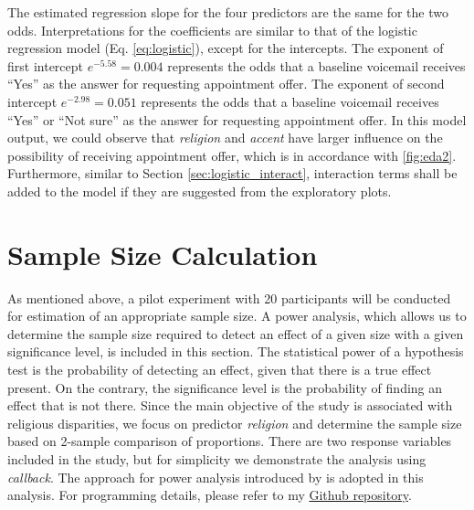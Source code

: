 \documentclass[11pt]{article}
\begin{document}
The estimated regression slope for the four predictors are the same for the two odds. Interpretations for the coefficients are similar to that of the logistic regression model (Eq. \ref{eq:logistic}), except for the intercepts. The exponent of first intercept $e^{-5.58} = 0.004$ represents the odds that a baseline voicemail receives ``Yes'' as the answer for requesting appointment offer. The exponent of second intercept $e^{-2.98} = 0.051$ represents the odds that a baseline voicemail receives ``Yes'' or ``Not sure'' as the answer for requesting appointment offer. In this model output, we could observe that \textit{religion} and \textit{accent} have larger influence on the possibility of receiving appointment offer, which is in accordance with \autoref{fig:eda2}. Furthermore, similar to Section \ref{sec:logistic_interact}, interaction terms shall be added to the model if they are suggested from the exploratory plots.


\section{Sample Size Calculation}
As mentioned above, a pilot experiment with 20 participants will be conducted for estimation of an appropriate sample size. A power analysis, which allows us to determine the sample size required to detect an effect of a given size with a given significance level, is included in this section. The statistical power of a hypothesis test is the probability of detecting an effect, given that there is a true effect present. On the contrary, the significance level is the probability of finding an effect that is not there. Since the main objective of the study is associated with religious disparities, we focus on predictor \textit{religion} and determine the sample size based on 2-sample comparison of proportions. There are two response variables included in the study, but for simplicity we demonstrate the analysis using \textit{callback}. The approach for power analysis introduced by \citet{wang2007} is adopted in this analysis. For programming details, please refer to my \href{https://github.com/NingShen1997/STAT551_Case34}{Github repository}.
\end{document}
